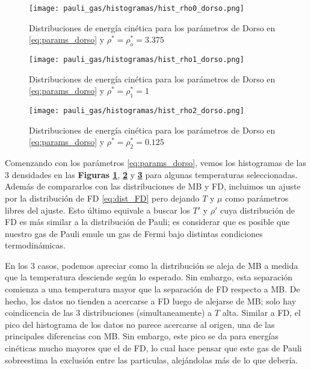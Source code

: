 \begin{figure}[H]
	\centering
	\texttt{[image: pauli\_gas/histogramas/hist\_rho0\_dorso.png]}
	\caption{Distribuciones de energía cinética para los parámetros de Dorso en \eqref{eq:params_dorso} y $\rho^* = \rho_o^* = 3.375$}
	\label{fig:hist_rho0_dorso}
\end{figure}

\begin{figure}[H]
	\centering
	\texttt{[image: pauli\_gas/histogramas/hist\_rho1\_dorso.png]}
	\caption{Distribuciones de energía cinética para los parámetros de Dorso en \eqref{eq:params_dorso} y $\rho^* = \rho_1^* = 1$}
	\label{fig:hist_rho1_dorso}
\end{figure}
\begin{figure}[H]
	\centering
	\texttt{[image: pauli\_gas/histogramas/hist\_rho2\_dorso.png]}
	\caption{Distribuciones de energía cinética para los parámetros de Dorso en \eqref{eq:params_dorso} y $\rho^* = \rho_2^* = 0.125$}
	\label{fig:hist_rho2_dorso}
\end{figure}

Comenzando con los parámetros \eqref{eq:params_dorso}, vemos los histogramas de las 3 densidades en las \textbf{Figuras \ref{fig:hist_rho0_dorso}}, 
\textbf{\ref{fig:hist_rho1_dorso}} y \textbf{\ref{fig:hist_rho2_dorso}} para algunas temperaturas seleccionadas.
Además de compararlos con las distribuciones de MB y FD, incluimos un ajuste por la distribución de FD \eqref{eq:dist_FD} pero dejando $T$ y $\mu$ como parámetros libres del ajuste.
Esto último equivale a buscar los $T'$ y $\rho'$ cuya distribución de FD es más similar a la distribución de Pauli; es considerar que es posible que nuestro gas de Pauli
emule un gas de Fermi bajo distintas condiciones termodinámicas.

En los 3 casos, podemos apreciar como la distribución se aleja de MB a medida que la temperatura desciende según lo esperado.
Sin embargo, esta separación comienza a una temperatura mayor que la separación de FD respecto a MB.
De hecho, los datos no tienden a acercarse a FD luego de alejarse de MB; solo hay coindicencia de las 3 distribuciones (simultaneamente) a $T$ alta.
Similar a FD, el pico del histograma de los datos no parece acercarse al origen, una de las principales diferencias con MB.
Sin embargo, este pico se da para energías cinéticas mucho mayores que el de FD, lo cual hace pensar que este gas de Pauli sobreestima la exclusión entre las particulas, alejándolas
más de lo que debería.

